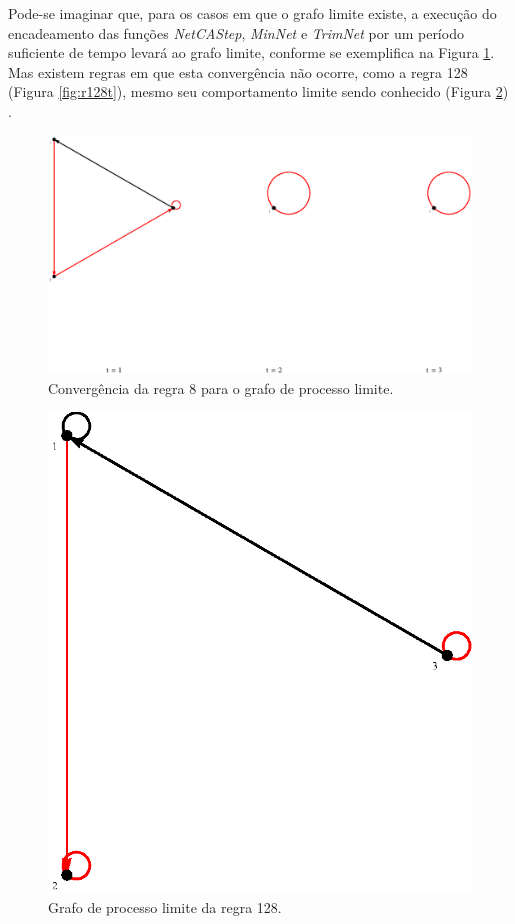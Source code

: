 \documentclass[12pt,a4paper]{article}
\begin{document}
Pode-se imaginar que, para os casos em que o grafo
limite existe, a execução do encadeamento das funções \emph{NetCAStep},
\emph{MinNet} e \emph{TrimNet} por um período suficiente de tempo levará
ao grafo limite, conforme se exemplifica na Figura \ref{fig:r8t}. Mas
existem regras em que esta convergência não ocorre, como a regra 128
(Figura \ref{fig:r128t}), mesmo seu comportamento limite
sendo conhecido (Figura \ref{fig:limit128}) .

\begin{figure}[htp]
\begin{center}
\includegraphics[scale=0.5]{img/Rule8.eps}
\caption{Convergência da regra 8 para o grafo de processo limite.}
\label{fig:r8t}
\end{center}
\end{figure}

\begin{figure}[htp]
\begin{center}
\includegraphics[scale=0.5]{img/limit128.eps}
\caption{Grafo de processo limite da regra 128.}
\label{fig:limit128}
\end{center}
\end{figure}
\end{document}
